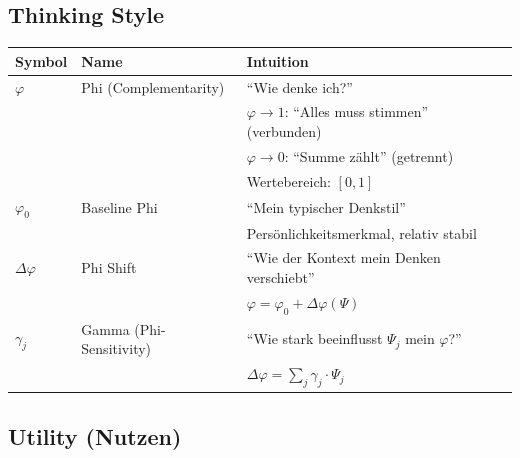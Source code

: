\subsection{Thinking Style}

\begin{longtable}{p{2cm}p{4cm}p{7cm}}
\toprule
\textbf{Symbol} & \textbf{Name} & \textbf{Intuition} \\
\midrule
\endhead

$\varphi$ & Phi (Complementarity) & 
``Wie denke ich?'' \\
& & $\varphi \to 1$: ``Alles muss stimmen'' (verbunden) \\
& & $\varphi \to 0$: ``Summe zählt'' (getrennt) \\
& & Wertebereich: $[0, 1]$ \\[6pt]

$\varphi_0$ & Baseline Phi & 
``Mein typischer Denkstil'' \\
& & Persönlichkeitsmerkmal, relativ stabil \\[6pt]

$\Delta\varphi$ & Phi Shift & 
``Wie der Kontext mein Denken verschiebt'' \\
& & $\varphi = \varphi_0 + \Delta\varphi(\Psi)$ \\[6pt]

$\gamma_j$ & Gamma (Phi-Sensitivity) & 
``Wie stark beeinflusst $\Psi_j$ mein $\varphi$?'' \\
& & $\Delta\varphi = \sum_j \gamma_j \cdot \Psi_j$ \\[6pt]

\bottomrule
\end{longtable}

\subsection{Utility (Nutzen)}

